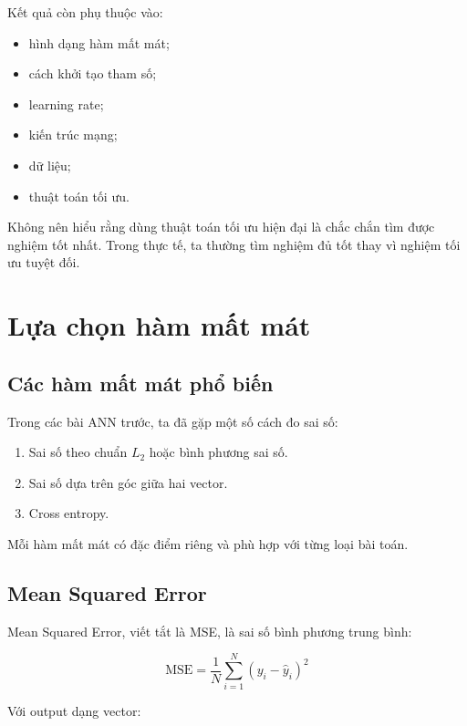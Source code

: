 Kết quả còn phụ thuộc vào:

\begin{itemize}
    \item hình dạng hàm mất mát;
    \item cách khởi tạo tham số;
    \item learning rate;
    \item kiến trúc mạng;
    \item dữ liệu;
    \item thuật toán tối ưu.
\end{itemize}

\begin{canhbao}
Không nên hiểu rằng dùng thuật toán tối ưu hiện đại là chắc chắn tìm được nghiệm tốt nhất. Trong thực tế, ta thường tìm nghiệm đủ tốt thay vì nghiệm tối ưu tuyệt đối.
\end{canhbao}

\section{Lựa chọn hàm mất mát}

\subsection{Các hàm mất mát phổ biến}

Trong các bài ANN trước, ta đã gặp một số cách đo sai số:

\begin{enumerate}
    \item Sai số theo chuẩn $L_2$ hoặc bình phương sai số.
    \item Sai số dựa trên góc giữa hai vector.
    \item Cross entropy.
\end{enumerate}

Mỗi hàm mất mát có đặc điểm riêng và phù hợp với từng loại bài toán.

\subsection{Mean Squared Error}

Mean Squared Error, viết tắt là MSE, là sai số bình phương trung bình:

\[
    \text{MSE}
    =
    \frac{1}{N}
    \sum_{i=1}^{N}
    (y_i-\hat{y}_i)^2
\]

Với output dạng vector:

